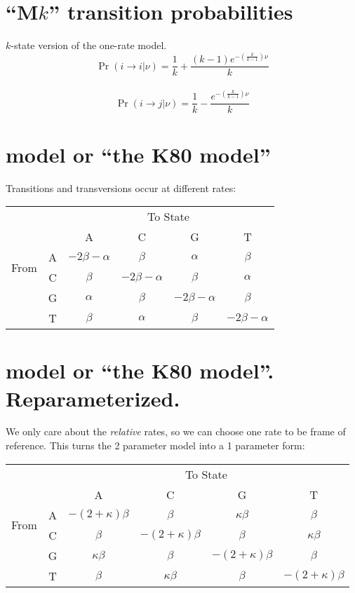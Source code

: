 \documentclass[landscape]{foils}
\begin{document}
\myNewSlide
\section*{``M$k$'' transition probabilities}
$k$-state version of the one-rate model.
\Large
$$\Pr(i\rightarrow i|\nu) = \frac{1}{k} + \frac{(k-1)e^{-\left(\frac{k}{k-1}\right)\nu}}{k}$$\\
$$\Pr(i\rightarrow j|\nu) = \frac{1}{k} - \frac{e^{-\left(\frac{k}{k-1}\right)\nu}}{k} $$




\myNewSlide
\section*{\citet{Kimura1980} model or ``the K80 model''}

Transitions and transversions occur at different rates:

\begin{table}[htdp]
\begin{center}
\begin{tabular}{cc|cccc}
& & \multicolumn{4}{c}{To State} \\
& & A & C & G & T \\
\hline
\multirow{2}{*}{From } & A &  $-2\beta - \alpha$ & $\beta $ & $\alpha$ & $\beta $    \\
\multirow{2}{*}{State } &C & $\beta $ & $-2\beta - \alpha$ & $\beta $ & $\alpha$    \\
 &G & $\alpha$ & $\beta $ & $-2\beta - \alpha$ & $\beta $    \\
 &T & $\beta $ & $\alpha$ & $\beta $ & $-2\beta - \alpha$    \\
\end{tabular}
\end{center}
\end{table}

\myNewSlide
\section*{\citet{Kimura1980} model or ``the K80 model''. Reparameterized.}
\large
We only care about the {\em relative} rates, so we can choose one rate to be frame of reference. This turns the 2 parameter model into a 1 parameter form:

\begin{table}[htdp]
\begin{center}
\begin{tabular}{cc|cccc}
& & \multicolumn{4}{c}{To State} \\
& & A & C & G & T \\
\hline
\multirow{2}{*}{From } & A &  $-(2+\kappa)\beta$ & $\beta $ & $\kappa\beta$ & $\beta $    \\
\multirow{2}{*}{State } &C & $\beta $ & $-(2+\kappa)\beta$ & $\beta $ & $\kappa\beta$    \\
 &G & $\kappa\beta$ & $\beta $ & $-(2+\kappa)\beta$ & $\beta $    \\
 &T & $\beta $ & $\kappa\beta$ & $\beta $ & $-(2+\kappa)\beta$    \\
\end{tabular}
\end{center}
\end{table}
\end{document}
